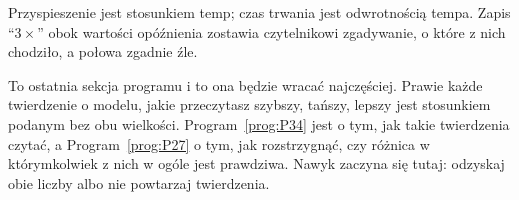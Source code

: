 \begin{fr}
Przyspieszenie jest stosunkiem temp; czas trwania jest odwrotnością tempa.
Zapis \enquote{$3\times$} obok wartości opóźnienia zostawia czytelnikowi
zgadywanie, o które z nich chodziło, a połowa zgadnie źle.

\begin{aibox}
To ostatnia sekcja programu i to ona będzie wracać najczęściej. Prawie każde
twierdzenie o modelu, jakie przeczytasz \dash{} szybszy, tańszy, lepszy
\dash{} jest stosunkiem podanym bez obu wielkości.
Program~\ref{prog:P34} jest o tym, jak takie twierdzenia czytać, a
Program~\ref{prog:P27} o tym, jak rozstrzygnąć, czy różnica w którymkolwiek z
nich w ogóle jest prawdziwa. Nawyk zaczyna się tutaj: odzyskaj obie liczby albo
nie powtarzaj twierdzenia.
\end{aibox}
\end{fr}

